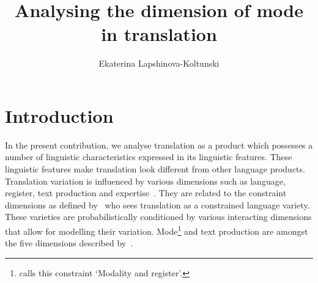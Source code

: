 \documentclass[output=paper,colorlinks,citecolor=brown]{langscibook}
\author{Ekaterina Lapshinova-Koltunski\affiliation{Universität des Saarlandes}}
\title{Analysing the dimension of mode in translation}
\begin{document}
\maketitle

\section{Introduction}\label{sec:intro}
In the present contribution, we analyse translation as a product which possesses a number of linguistic characteristics expressed in its linguistic features. These linguistic features make translation look different from other language products. %
Translation variation is influenced by various dimensions such as language, register, text production and expertise~\citep{Lapshinova2017Sle}. They are related to the constraint dimensions as defined by~\citet[p. 346]{Kruger2019} who sees translation as a constrained language variety. These varieties are probabilistically conditioned by various interacting  dimensions that allow for modelling their variation. %
Mode\footnote{\citet[p. 346]{Kruger2019} calls this constraint `Modality and register'.} and text production are amongst the five dimensions described by~\citet[p. 346]{Kruger2019}.
\end{document}
